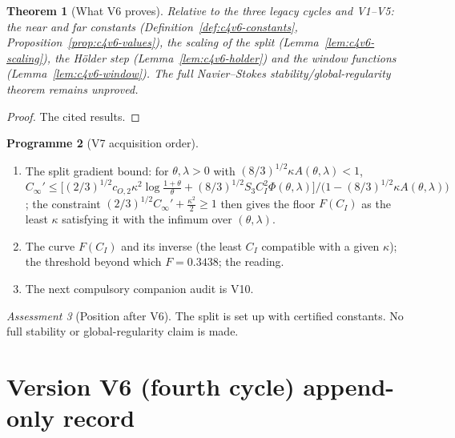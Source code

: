 \documentclass[11pt]{article}
\theoremstyle{plain}
\newtheorem{theorem}{Theorem}[section]
\theoremstyle{definition}
\newtheorem{programme}[theorem]{Programme}
\theoremstyle{remark}
\newtheorem{assessment}[theorem]{Assessment}
\begin{document}
\begin{theorem}[What V6 proves]
\label{thm:c4v6-conclusion}
Relative to the three legacy cycles and V1--V5: the near and far
constants (Definition~\ref{def:c4v6-constants}, Proposition~\ref{prop:c4v6-values}),
the scaling of the split (Lemma~\ref{lem:c4v6-scaling}), the H\"older step
(Lemma~\ref{lem:c4v6-holder}) and the window functions
(Lemma~\ref{lem:c4v6-window}).  The full Navier--Stokes
stability/global-regularity theorem remains unproved.
\end{theorem}

\begin{proof}
The cited results.
\end{proof}

\begin{programme}[V7 acquisition order]
\label{prog:c4v7}
\begin{enumerate}[label=\textup{(AC\arabic*)},leftmargin=4.8em]
\item The split gradient bound: for \(\theta,\lambda>0\) with \((8/3)^{1/2}\kappa A(\theta,\lambda)<1\),
      \(C_\infty'\le\bigl[(2/3)^{1/2}c_{O,2}\kappa^2\log\frac{1+\theta}\theta+(8/3)^{1/2}S_3C_I^2\Phi(\theta,\lambda)\bigr]/\bigl(1-(8/3)^{1/2}\kappa A(\theta,\lambda)\bigr)\);
      the constraint \((2/3)^{1/2}C_\infty'+\frac{\kappa^2}2\ge1\) then gives the floor \(F(C_I)\) as
      the least \(\kappa\) satisfying it with the infimum over \((\theta,\lambda)\).
\item The curve \(F(C_I)\) and its inverse (the least \(C_I\) compatible
      with a given \(\kappa\)); the threshold beyond which \(F=0.3438\); the
      reading.
\item The next compulsory companion audit is V10.
\end{enumerate}
\end{programme}

\begin{assessment}[Position after V6]
\label{ass:c4v6-position}
The split is set up with certified constants.  No full stability or
global-regularity claim is made.
\end{assessment}

\section*{Version V6 (fourth cycle) append-only record}
\end{document}

